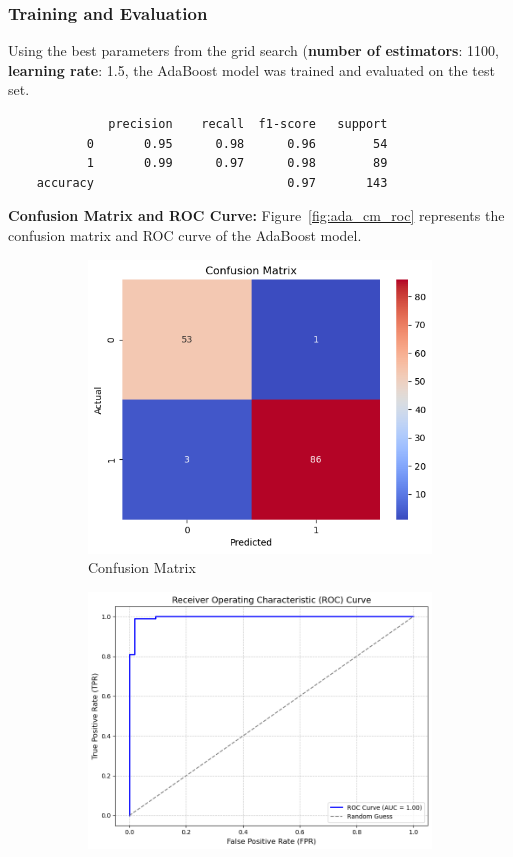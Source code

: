 \documentclass[12pt]{article}
\begin{document}
\subsubsection*{Training and Evaluation}
Using the best parameters from the grid search (\textbf{number of estimators}: 1100, \textbf{learning rate}: 1.5, the AdaBoost model was trained and evaluated on the test set.
\begin{verbatim}
              precision    recall  f1-score   support
           0       0.95      0.98      0.96        54
           1       0.99      0.97      0.98        89
    accuracy                           0.97       143
\end{verbatim}
\textbf{Confusion Matrix and ROC Curve:} Figure~\ref{fig:ada_cm_roc} represents the confusion matrix and ROC curve of the AdaBoost model.
\begin{figure}[H]
    \centering
    \begin{subfigure}[b]{0.4\textwidth}
        \centering
        \includegraphics[width=\textwidth]{assets/ada/ada-cm.png}
        \caption{Confusion Matrix}
        \label{fig:ada_cm}
    \end{subfigure}
    \hfill
    \begin{subfigure}[b]{0.4\textwidth}
        \centering
        \includegraphics[width=\textwidth]{assets/ada/ada-roc.png}

\end{subfigure}
\end{figure}
\end{document}
